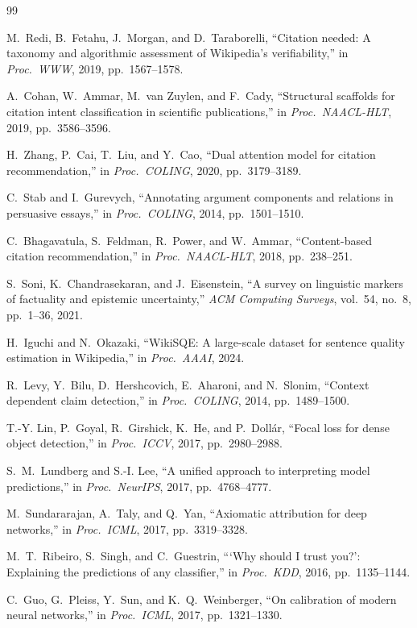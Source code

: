 \documentclass[conference]{IEEEtran}
\begin{document}
\begin{thebibliography}{99}

M.~Redi, B.~Fetahu, J.~Morgan, and D.~Taraborelli,
``Citation needed: A taxonomy and algorithmic assessment of Wikipedia's
verifiability,'' in \emph{Proc.\ WWW}, 2019, pp.\ 1567--1578.

A.~Cohan, W.~Ammar, M.~van Zuylen, and F.~Cady,
``Structural scaffolds for citation intent classification in scientific
publications,'' in \emph{Proc.\ NAACL-HLT}, 2019, pp.\ 3586--3596.

H.~Zhang, P.~Cai, T.~Liu, and Y.~Cao,
``Dual attention model for citation recommendation,'' in
\emph{Proc.\ COLING}, 2020, pp.\ 3179--3189.

C.~Stab and I.~Gurevych,
``Annotating argument components and relations in persuasive essays,''
in \emph{Proc.\ COLING}, 2014, pp.\ 1501--1510.

C.~Bhagavatula, S.~Feldman, R.~Power, and W.~Ammar,
``Content-based citation recommendation,'' in
\emph{Proc.\ NAACL-HLT}, 2018, pp.\ 238--251.

S.~Soni, K.~Chandrasekaran, and J.~Eisenstein,
``A survey on linguistic markers of factuality and epistemic
uncertainty,'' \emph{ACM Computing Surveys}, vol.\ 54, no.\ 8, pp.\
1--36, 2021.

H.~Iguchi and N.~Okazaki,
``WikiSQE: A large-scale dataset for sentence quality estimation in
Wikipedia,'' in \emph{Proc.\ AAAI}, 2024.

R.~Levy, Y.~Bilu, D.~Hershcovich, E.~Aharoni, and N.~Slonim,
``Context dependent claim detection,'' in \emph{Proc.\ COLING}, 2014,
pp.\ 1489--1500.

T.-Y. Lin, P.~Goyal, R.~Girshick, K.~He, and P.~Doll{\'a}r,
``Focal loss for dense object detection,'' in
\emph{Proc.\ ICCV}, 2017, pp.\ 2980--2988.

S.~M.~Lundberg and S.-I. Lee,
``A unified approach to interpreting model predictions,'' in
\emph{Proc.\ NeurIPS}, 2017, pp.\ 4768--4777.

M.~Sundararajan, A.~Taly, and Q.~Yan,
``Axiomatic attribution for deep networks,'' in
\emph{Proc.\ ICML}, 2017, pp.\ 3319--3328.

M.~T.~Ribeiro, S.~Singh, and C.~Guestrin,
```Why should I trust you?': Explaining the predictions of any
classifier,'' in \emph{Proc.\ KDD}, 2016, pp.\ 1135--1144.

C.~Guo, G.~Pleiss, Y.~Sun, and K.~Q.~Weinberger,
``On calibration of modern neural networks,'' in
\emph{Proc.\ ICML}, 2017, pp.\ 1321--1330.

\end{thebibliography}
\end{document}
